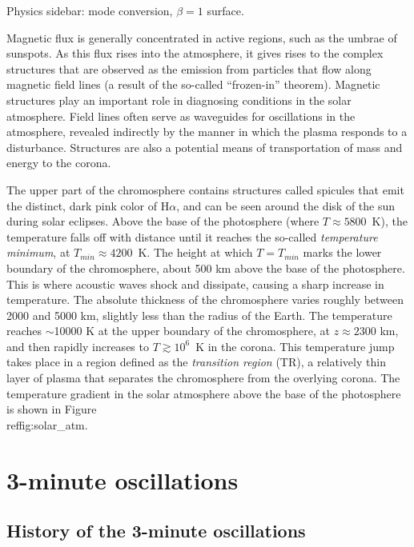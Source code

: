 \begin{framed}
    Physics sidebar: mode conversion, $\beta = 1$ surface.
\end{framed}

Magnetic flux is generally concentrated in active regions, such as the umbrae
of sunspots. As this flux rises into the atmosphere, it gives rises to the
complex structures that are observed as the emission from particles that flow
along magnetic field lines (a result of the so-called ``frozen-in'' theorem).
Magnetic structures play an important role in diagnosing conditions in the
solar atmosphere. Field lines often serve as waveguides for oscillations in the
atmosphere, revealed indirectly by the manner in which the plasma responds to a
disturbance. Structures are also a potential means of transportation of mass
and energy to the corona.


The upper part of
the chromosphere contains structures called spicules that emit the distinct,
dark pink color of H$\alpha$, and can be seen around the disk of the sun during
solar eclipses. Above the base of the photosphere (where $T \approx 5800$~K),
the temperature falls off with distance until it reaches the so-called
\textit{temperature minimum}, at $T_{min} \approx 4200$~K. The height at which
$T = T_{min}$ marks the lower boundary of the chromosphere, about 500 km above
the base of the photosphere. This is where acoustic waves shock and dissipate,
causing a sharp increase in temperature. The absolute thickness of the
chromosphere varies roughly between 2000 and 5000 km, slightly less than the
radius of the Earth. The temperature reaches $\sim$10000 K at the upper
boundary of the chromosphere, at $z \approx 2300$ km, and then rapidly
increases to $T\!\gtrsim\!10^{6}$~K in the corona.
This temperature jump takes
place in a region defined as the \textit{transition region} (TR), a relatively
thin layer of plasma that separates the chromosphere from the overlying corona.
The temperature gradient in the solar atmosphere above the base of the
photosphere is shown in
Figure~\\ref{fig:solar\_atm}.

\clearpage
\section{3-minute oscillations}

\subsection{History of the 3-minute oscillations}

